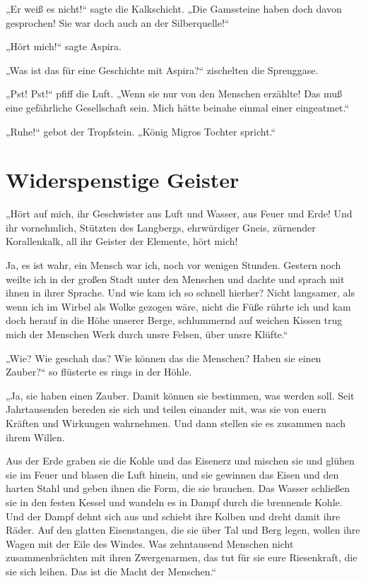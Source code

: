 „Er weiß es nicht!“ sagte die Kalkschicht. „Die Gamssteine haben
doch davon gesprochen! Sie war doch auch an der Silberquelle!“

„Hört mich!“ sagte Aspira.

„Was ist das für eine Geschichte mit Aspira?“ zischelten die
Sprenggase.

„Pst! Pst!“ pfiff die Luft. „Wenn sie nur von den Menschen
erzählte! Das muß eine gefährliche Gesellschaft sein. Mich hätte
beinahe einmal einer eingeatmet.“

„Ruhe!“ gebot der Tropfstein. „König Migros Tochter spricht.“

\section{Widerspenstige Geister}

„Hört auf mich, ihr Geschwister aus Luft und Wasser, aus Feuer und
Erde! Und ihr vornehmlich, Stützten des Langbergs, ehrwürdiger
Gneis, zürnender Korallenkalk, all ihr Geister der Elemente, hört
mich!

Ja, es ist wahr, ein Mensch war ich, noch vor wenigen Stunden.
Gestern noch weilte ich in der großen Stadt unter den Menschen und
dachte und sprach mit ihnen in ihrer Sprache. Und wie kam ich so
schnell hierher? Nicht langsamer, als wenn ich im Wirbel als Wolke
gezogen wäre, nicht die Füße rührte ich und kam doch herauf in die
Höhe unserer Berge, schlummernd auf weichen Kissen trug mich der
Menschen Werk durch unsre Felsen, über unsre Klüfte.“

„Wie? Wie geschah das? Wie können das die Menschen? Haben sie einen
Zauber?“ so flüsterte es rings in der Höhle.

„Ja, sie haben einen Zauber. Damit können sie bestimmen, was werden
soll. Seit Jahrtausenden bereden sie sich und teilen einander mit,
was sie von euern Kräften und Wirkungen wahrnehmen. Und dann
stellen sie es zusammen nach ihrem Willen.

Aus der Erde graben sie die Kohle und das Eisenerz und mischen sie
und glühen sie im Feuer und blasen die Luft hinein, und sie
gewinnen das Eisen und den harten Stahl und geben ihnen die Form,
die sie brauchen. Das Wasser schließen sie in den festen Kessel und
wandeln es in Dampf durch die brennende Kohle. Und der Dampf dehnt
sich aus und schiebt ihre Kolben und dreht damit ihre Räder. Auf
den glatten Eisenstangen, die sie über Tal und Berg legen, wollen
ihre Wagen mit der Eile des Windes. Was zehntausend Menschen nicht
zusammenbrächten mit ihren Zwergenarmen, das tut für sie eure
Riesenkraft, die sie sich leihen. Das ist die Macht der Menschen.“

